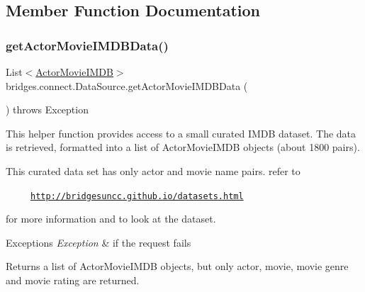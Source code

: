 \subsection{Member Function Documentation}
\mbox{\label{classbridges_1_1connect_1_1_data_source_aaaef8df40e95d5370a7f172c301d2d9f}} 
\subsubsection{\texorpdfstring{get\+Actor\+Movie\+I\+M\+D\+B\+Data()}{getActorMovieIMDBData()}\hspace{0.1cm}{\footnotesize\ttfamily [1/2]}}
{\footnotesize\ttfamily List$<$\hyperlink{classbridges_1_1data__src__dependent_1_1_actor_movie_i_m_d_b}{Actor\+Movie\+I\+M\+DB}$>$ bridges.\+connect.\+Data\+Source.\+get\+Actor\+Movie\+I\+M\+D\+B\+Data (\begin{DoxyParamCaption}{ }\end{DoxyParamCaption}) throws Exception}

This helper function provides access to a small curated I\+M\+DB dataset. The data is retrieved, formatted into a list of Actor\+Movie\+I\+M\+DB objects (about 1800 pairs).

This curated data set has only actor and movie name pairs. refer to 

~~~~~\href{http://bridgesuncc.github.io/datasets.html}{\tt http\+://bridgesuncc.\+github.\+io/datasets.\+html} 

for more information and to look at the dataset.


\begin{DoxyExceptions}{Exceptions}
{\em Exception} & if the request fails\\
\hline
\end{DoxyExceptions}
\begin{DoxyReturn}{Returns}
a list of Actor\+Movie\+I\+M\+DB objects, but only actor, movie, movie genre and movie rating are returned. 
\end{DoxyReturn}
\mbox{\label{classbridges_1_1connect_1_1_data_source_a3b3c231fee0ce328fb8f79807742aecd}} 
